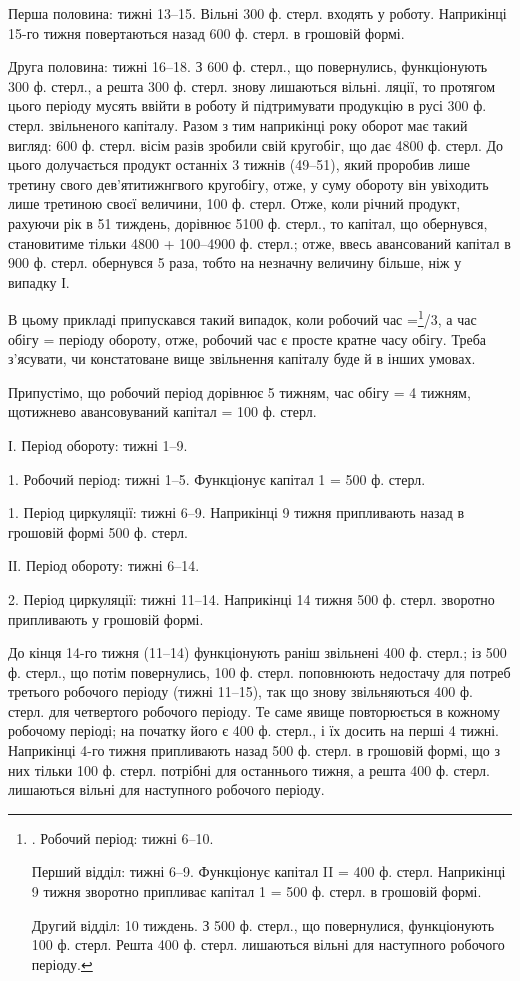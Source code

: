 Перша половина: тижні 13--15. Вільні 300 ф. стерл. входять у
роботу. Наприкінці 15-го тижня повертаються назад 600 ф. стерл. в грошовій
формі.

Друга половина: тижні 16--18. З 600 ф. стерл., що повернулись,
функціонують 300 ф. стерл., а решта 300 ф. стерл. знову лишаються
вільні.
ляції, то протягом цього періоду мусять ввійти в роботу й підтримувати
продукцію в русі 300 ф. стерл. звільненого капіталу. Разом з тим наприкінці
року оборот має такий вигляд: 600 ф. стерл. вісім разів зробили
свій кругобіг, що дає 4800 ф. стерл. До цього долучається продукт
останніх 3 тижнів (49--51), який проробив лише третину свого дев’ятитижнгвого
кругобігу, отже, у суму обороту він увіходить лише третиною
своєї величини, 100 ф. стерл. Отже, коли річний продукт, рахуючи рік в
51 тиждень, дорівнює 5100 ф. стерл., то капітал, що обернувся, становитиме
тільки 4800 + 100--4900 ф. стерл.; отже, ввесь авансований капітал
в 900 ф. стерл. обернувся 5 раза, тобто на незначну величину більше,
ніж у випадку І.

В цьому прикладі припускався такий випадок, коли робочий час =\footnote{
. Робочий період: тижні 6--10.

Перший відділ: тижні 6--9. Функціонує капітал II = 400 ф. стерл.
Наприкінці 9 тижня зворотно припливає капітал 1 = 500 ф. стерл. в грошовій
формі.

Другий відділ: 10 тиждень. З 500 ф. стерл., що повернулися, функціонують
100 ф. стерл. Решта 400 ф. стерл. лишаються вільні для наступного
робочого періоду.
}/3,
а час обігу =  періоду обороту, отже, робочий час є просте кратне
часу обігу. Треба з’ясувати, чи констатоване вище звільнення капіталу
буде й в інших умовах.

Припустімо, що робочий період дорівнює 5 тижням, час обігу = 4 тижням,
щотижнево авансовуваний капітал = 100 ф. стерл.

І. Період обороту: тижні 1--9.

1. Робочий період: тижні 1--5. Функціонує капітал 1 = 500 ф. стерл.

1. Період циркуляції: тижні 6--9. Наприкінці 9 тижня припливають
назад в грошовій формі 500 ф. стерл.

ІІ. Період обороту: тижні 6--14.

2. Період циркуляції: тижні 11--14. Наприкінці 14 тижня 500 ф.
стерл. зворотно припливають у грошовій формі.

До кінця 14-го тижня (11--14) функціонують раніш звільнені 400 ф.
стерл.; із 500 ф. стерл., що потім повернулись, 100 ф. стерл. поповнюють
недостачу для потреб третього робочого періоду (тижні 11--15),
так що знову звільняються 400 ф. стерл. для четвертого робочого періоду.
Те саме явище повторюється в кожному робочому періоді; на
початку його є 400 ф. стерл., і їх досить на перші 4 тижні. Наприкінці
4-го тижня припливають назад 500 ф. стерл. в грошовій формі, що з
них тільки 100 ф. стерл. потрібні для останнього тижня, а решта 400 ф.
стерл. лишаються вільні для наступного робочого періоду.

